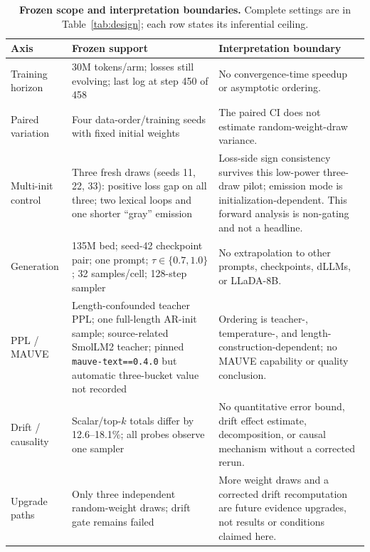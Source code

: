 \documentclass{article}
\newcommand{\armA}{AR-init}
\begin{document}
\begin{table}[!t]
  \caption{\textbf{Frozen scope and interpretation boundaries.}  Complete
  settings are in Table~\ref{tab:design}; each row states its inferential ceiling.}
  \label{tab:limits}
  \centering
  \footnotesize
  \setlength{\tabcolsep}{4pt}
  \renewcommand{\arraystretch}{0.94}
  \begin{tabularx}{\textwidth}{@{}L{0.13\textwidth}L{0.37\textwidth}Y@{}}
    \toprule
    Axis & Frozen support & Interpretation boundary \\
    \midrule
    Training horizon & 30M tokens/arm; losses still evolving; last log at step
      450 of 458 & No convergence-time speedup or asymptotic ordering. \\
    Paired variation & Four data-order/training seeds with fixed initial
      weights & The paired CI does not estimate random-weight-draw variance. \\
    Multi-init control & Three fresh draws (seeds 11, 22, 33): positive loss
      gap on all three; two lexical loops and one shorter ``gray'' emission &
      Loss-side sign consistency survives this low-power three-draw pilot;
      emission mode is initialization-dependent.  This forward analysis is
      non-gating and not a headline. \\
    Generation & 135M bed; seed-42 checkpoint pair; one prompt;
      $\tau\in\{0.7,1.0\}$; 32 samples/cell; 128-step sampler & No
      extrapolation to other prompts, checkpoints, dLLMs, or LLaDA-8B. \\
    PPL / MAUVE & Length-confounded teacher PPL; one full-length \armA{}
      sample; source-related SmolLM2 teacher; pinned \texttt{mauve-text==0.4.0}
      but automatic three-bucket value not recorded & Ordering is
      teacher-, temperature-, and length-construction-dependent; no MAUVE
      capability or quality conclusion. \\
    Drift / causality & Scalar/top-$k$ totals differ by 12.6--18.1\%; all
      probes observe one sampler & No quantitative error bound, drift effect
      estimate, decomposition, or causal mechanism without a corrected rerun. \\
    Upgrade paths & Only three independent random-weight draws; drift gate
      remains failed & More weight draws and a corrected drift recomputation
      are future evidence upgrades, not results or conditions claimed here. \\
    \bottomrule
  \end{tabularx}
\end{table}
\end{document}
